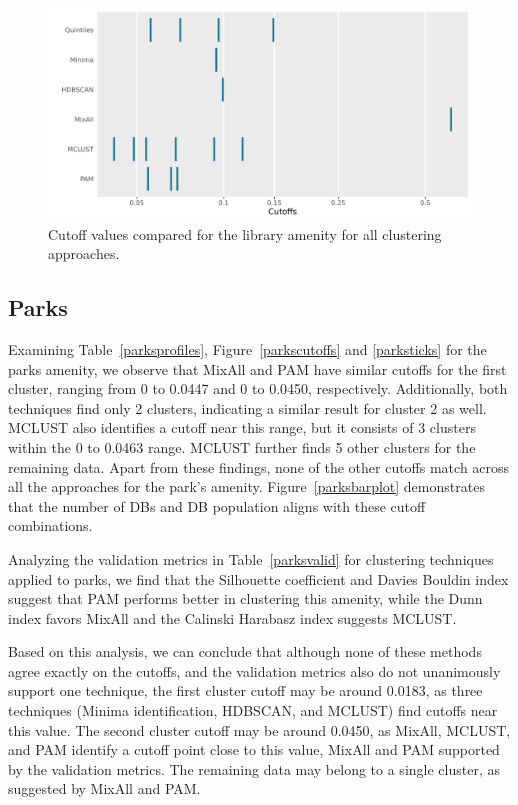 \documentclass[11pt, a4paper]{article}
\begin{document}
\begin{figure}[H]
\centering
\includegraphics[width=\textwidth]{./cutoff_ticks/Library_ticks.png}
\caption[Library cutoff comparison]{Cutoff values compared for the library amenity for all clustering approaches.}\label{libraryticks}
\end{figure}










\justifying
\subsection{Parks}

Examining Table~\ref{parksprofiles}, Figure~\ref{parkscutoffs} and \ref{parksticks} for the parks amenity, we observe that MixAll and PAM have similar cutoffs for the first cluster, ranging from 0 to 0.0447 and 0 to 0.0450, respectively. Additionally, both techniques find only 2 clusters, indicating a similar result for cluster 2 as well. MCLUST also identifies a cutoff near this range, but it consists of 3 clusters within the 0 to 0.0463 range. MCLUST further finds 5 other clusters for the remaining data. Apart from these findings, none of the other cutoffs match across all the approaches for the park's amenity. Figure~\ref{parksbarplot} demonstrates that the number of DBs and DB population aligns with these cutoff combinations.
\par
Analyzing the validation metrics in Table~\ref{parksvalid} for clustering techniques applied to parks, we find that the Silhouette coefficient and Davies Bouldin index suggest that PAM performs better in clustering this amenity, while the Dunn index favors MixAll and the Calinski Harabasz index suggests MCLUST.
\par
Based on this analysis, we can conclude that although none of these methods agree exactly on the cutoffs, and the validation metrics also do not unanimously support one technique, the first cluster cutoff may be around 0.0183, as three techniques (Minima identification, HDBSCAN, and MCLUST) find cutoffs near this value. The second cluster cutoff may be around 0.0450, as MixAll, MCLUST, and PAM identify a cutoff point close to this value, MixAll and PAM supported by the validation metrics. The remaining data may belong to a single cluster, as suggested by MixAll and PAM.
\end{document}
